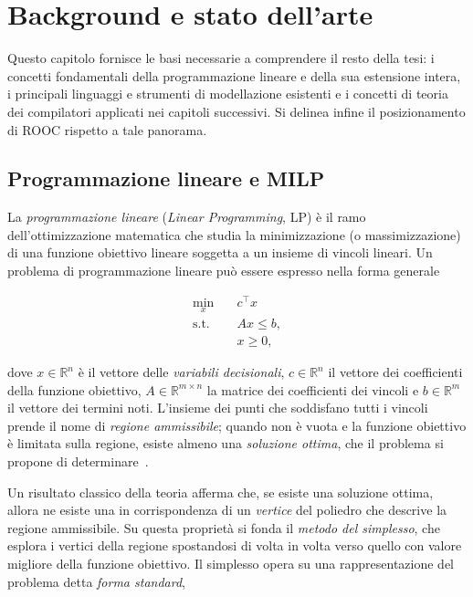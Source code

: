 
\chapter{Background e stato dell'arte}
\label{cap:background}

Questo capitolo fornisce le basi necessarie a comprendere il resto della tesi: i
concetti fondamentali della programmazione lineare e della sua estensione intera,
i principali linguaggi e strumenti di modellazione esistenti e i concetti di
teoria dei compilatori applicati nei capitoli successivi. Si delinea infine il
posizionamento di ROOC rispetto a tale panorama.

\section{Programmazione lineare e MILP}
\label{sec:lp-milp}

La \emph{programmazione lineare} (\emph{Linear Programming}, LP) è il ramo
dell'ottimizzazione matematica che studia la minimizzazione (o massimizzazione)
di una funzione obiettivo lineare soggetta a un insieme di vincoli lineari. Un
problema di programmazione lineare può essere espresso nella forma generale

\begin{equation}
\label{eq:lp-generale}
\begin{aligned}
\min_{x} \quad & c^\top x \\
\text{s.t.} \quad & A x \le b, \\
                  & x \ge 0,
\end{aligned}
\end{equation}

dove $x \in \mathbb{R}^n$ è il vettore delle \emph{variabili decisionali},
$c \in \mathbb{R}^n$ il vettore dei coefficienti della funzione obiettivo,
$A \in \mathbb{R}^{m \times n}$ la matrice dei coefficienti dei vincoli e
$b \in \mathbb{R}^m$ il vettore dei termini noti. L'insieme dei punti che
soddisfano tutti i vincoli prende il nome di \emph{regione ammissibile}; quando
non è vuota e la funzione obiettivo è limitata sulla regione, esiste almeno una
\emph{soluzione ottima}, che il problema si propone di determinare~\cite{dantzig1963,bertsimas1997}.

Un risultato classico della teoria afferma che, se esiste una soluzione ottima,
allora ne esiste una in corrispondenza di un \emph{vertice} del poliedro che
descrive la regione ammissibile. Su questa proprietà si fonda il \emph{metodo
del simplesso}, che esplora i vertici della regione spostandosi di volta in
volta verso quello con valore migliore della funzione obiettivo. Il simplesso
opera su una rappresentazione del problema detta \emph{forma standard},

